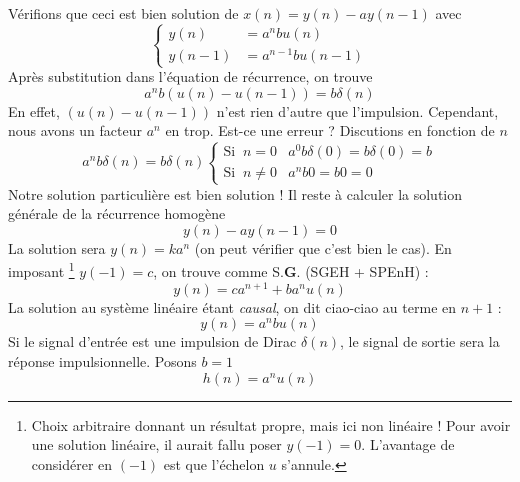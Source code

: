 {Vérifions que ceci est bien solution de $x(n) = y(n)-ay(n-1)$ avec
\begin{equation}
\left\{\begin{array}{ll}
y(n) &= a^nbu(n)\\
y(n-1) &= a^{n-1}bu(n-1)
\end{array}\right.
\end{equation}
Après substitution dans l'équation de récurrence, on trouve
\begin{equation}
a^nb(u(n) - u(n-1)) = b\delta(n)
\end{equation}
En effet, $(u(n) - u(n-1))$ n'est rien d'autre que l'impulsion. Cependant, nous 
avons un facteur $a^n$ en trop. Est-ce une erreur ? Discutions en fonction de $n$
\begin{equation}
a^nb\delta(n)=b\delta(n) \left\{\begin{array}{ll}
\text{Si }\ n=0 & a^0b\delta(0)=b\delta(0)=b\\
\text{Si }\ n\neq 0 & a^nb0=b0=0
\end{array}\right.
\end{equation}
Notre solution particulière est bien solution ! Il reste à calculer la solution 
générale de la récurrence homogène
\begin{equation}
y(n) -ay(n-1) = 0
\end{equation}
La solution sera $y(n)=ka^n$ (on peut vérifier que c'est bien le cas). En imposant
\footnote{Choix arbitraire donnant un résultat propre, mais ici non linéaire ! Pour 
avoir une solution linéaire, il aurait fallu poser $y(-1)=0$. L'avantage de considérer 
en $(-1)$ est que l'échelon $u$ s'annule.} $y(-1)=c$, 
on trouve comme S.\textbf{G}. (SGEH + SPEnH) :
\begin{equation}
y(n) = ca^{n+1}+ba^nu(n)
\end{equation}
La solution au système linéaire étant \textit{causal}, on dit ciao-ciao au terme en $n+1$ :
\begin{equation}
y(n) = a^nbu(n)
\end{equation}
Si le signal d'entrée est une impulsion de Dirac $\delta(n)$, le signal de sortie sera la 
réponse impulsionnelle. Posons $b=1$
\begin{equation}
h(n) = a^nu(n)
\end{equation}}

